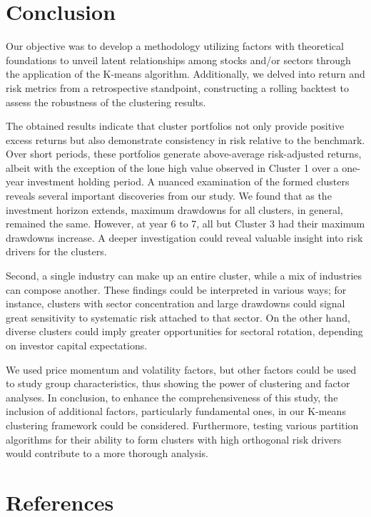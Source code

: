 \documentclass[11pt,preprint, authoryear]{elsarticle}
\numberwithin{equation}{section}
\numberwithin{figure}{section}
\numberwithin{table}{section}
\begin{document}
\hypertarget{conclusion}{%
\section{\texorpdfstring{Conclusion
\label{con}}{Conclusion }}\label{conclusion}}

Our objective was to develop a methodology utilizing factors with
theoretical foundations to unveil latent relationships among stocks
and/or sectors through the application of the K-means algorithm.
Additionally, we delved into return and risk metrics from a
retrospective standpoint, constructing a rolling backtest to assess the
robustness of the clustering results.

The obtained results indicate that cluster portfolios not only provide
positive excess returns but also demonstrate consistency in risk
relative to the benchmark. Over short periods, these portfolios generate
above-average risk-adjusted returns, albeit with the exception of the
lone high value observed in Cluster 1 over a one-year investment holding
period. A nuanced examination of the formed clusters reveals several
important discoveries from our study. We found that as the investment
horizon extends, maximum drawdowns for all clusters, in general,
remained the same. However, at year 6 to 7, all but Cluster 3 had their
maximum drawdowns increase. A deeper investigation could reveal valuable
insight into risk drivers for the clusters.

Second, a single industry can make up an entire cluster, while a mix of
industries can compose another. These findings could be interpreted in
various ways; for instance, clusters with sector concentration and large
drawdowns could signal great sensitivity to systematic risk attached to
that sector. On the other hand, diverse clusters could imply greater
opportunities for sectoral rotation, depending on investor capital
expectations.

We used price momentum and volatility factors, but other factors could
be used to study group characteristics, thus showing the power of
clustering and factor analyses. In conclusion, to enhance the
comprehensiveness of this study, the inclusion of additional factors,
particularly fundamental ones, in our K-means clustering framework could
be considered. Furthermore, testing various partition algorithms for
their ability to form clusters with high orthogonal risk drivers would
contribute to a more thorough analysis.

\newpage

\hypertarget{references}{%
\section{References}\label{references}}
\end{document}
